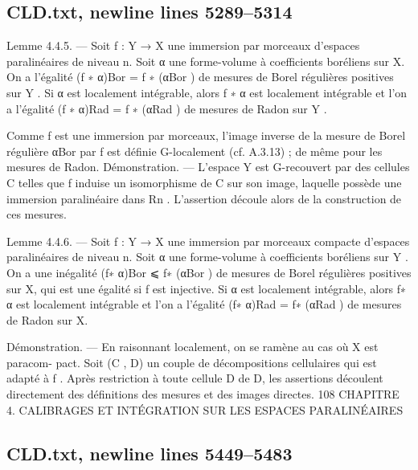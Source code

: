 \documentclass[
  10pt,
]{article}
\newenvironment{Shaded}{}{}
\newcommand{\NormalTok}[1]{#1}
\begin{document}
\subsection{CLD.txt, newline lines
5289--5314}\label{cld.txt-newline-lines-52895314}

\begin{Shaded}
\begin{Highlighting}[]

\NormalTok{Lemme 4.4.5. — Soit f : Y → X une immersion par morceaux d’espaces paralinéaires}
\NormalTok{de niveau n. Soit α une forme{-}volume à coefficients boréliens sur X. On a l’égalité}
\NormalTok{(f ∗ α)Bor = f ∗ (αBor ) de mesures de Borel régulières positives sur Y . Si α est localement}
\NormalTok{intégrable, alors f ∗ α est localement intégrable et l’on a l’égalité (f ∗ α)Rad = f ∗ (αRad ) de}
\NormalTok{mesures de Radon sur Y .}

\NormalTok{   Comme f est une immersion par morceaux, l’image inverse de la mesure de Borel}
\NormalTok{régulière αBor par f est définie G{-}localement (cf. A.3.13) ; de même pour les mesures de}
\NormalTok{Radon.}
\NormalTok{Démonstration. — L’espace Y est G{-}recouvert par des cellules C telles que f induise un}
\NormalTok{isomorphisme de C sur son image, laquelle possède une immersion paralinéaire dans Rn .}
\NormalTok{L’assertion découle alors de la construction de ces mesures.}

\NormalTok{Lemme 4.4.6. — Soit f : Y → X une immersion par morceaux compacte d’espaces}
\NormalTok{paralinéaires de niveau n. Soit α une forme{-}volume à coefficients boréliens sur Y . On}
\NormalTok{a une inégalité (f∗ α)Bor ⩽ f∗ (αBor ) de mesures de Borel régulières positives sur X, qui}
\NormalTok{est une égalité si f est injective. Si α est localement intégrable, alors f∗ α est localement}
\NormalTok{intégrable et l’on a l’égalité (f∗ α)Rad = f∗ (αRad ) de mesures de Radon sur X.}

\NormalTok{Démonstration. — En raisonnant localement, on se ramène au cas où X est paracom{-}}
\NormalTok{pact. Soit (C , D) un couple de décompositions cellulaires qui est adapté à f . Après}
\NormalTok{restriction à toute cellule D de D, les assertions découlent directement des définitions}
\NormalTok{des mesures et des images directes.}
\NormalTok{108    CHAPITRE 4. CALIBRAGES ET INTÉGRATION SUR LES ESPACES PARALINÉAIRES}
\end{Highlighting}
\end{Shaded}

\subsection{CLD.txt, newline lines
5449--5483}\label{cld.txt-newline-lines-54495483}
\end{document}
